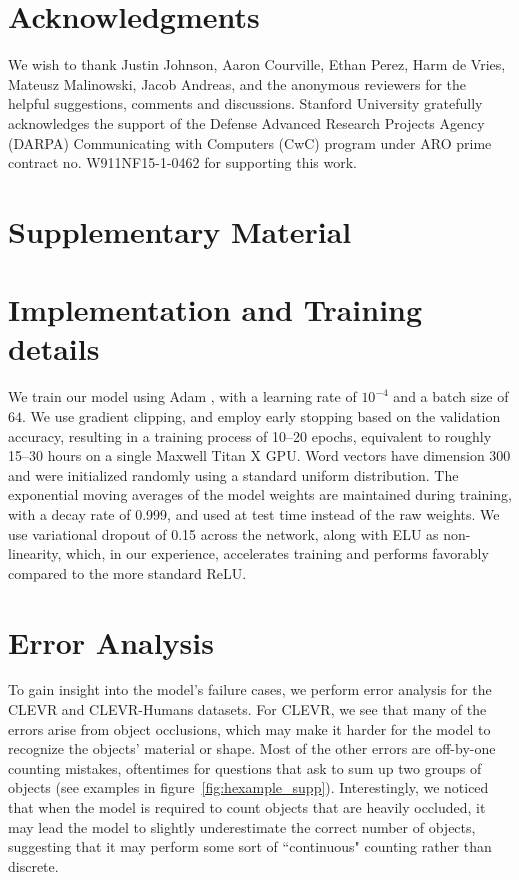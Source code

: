 \documentclass[fleqn]{article}
\newcommand{\figref}[1]{figure~\ref{fig:#1}}
\begin{document}
\section{Acknowledgments}
We wish to thank Justin Johnson, Aaron Courville, Ethan Perez, Harm de Vries, Mateusz Malinowski, Jacob Andreas, and the anonymous reviewers for the helpful suggestions, comments and discussions. Stanford University gratefully acknowledges the support of the Defense Advanced
Research Projects Agency (DARPA) Communicating with Computers (CwC) program under ARO prime contract no. W911NF15-1-0462 for supporting this work.

\newpage



\newpage
\appendix

\section*{Supplementary Material}

\section{Implementation and Training details}
\label{sec:expDetails} 
We train our model using Adam \citep{adam}, with a learning rate of \({10}^{-4}\) and a batch size of \(64\). We use gradient clipping, and employ early stopping based on the validation accuracy, resulting in a training process of 10--20 epochs, equivalent to roughly 15--30 hours on a single Maxwell Titan X GPU. Word vectors have dimension 300 and were initialized randomly using a standard uniform distribution. The exponential moving averages of the model weights are maintained during training, with a decay rate of 0.999, and used at test time instead of the raw weights. We use variational dropout of 0.15 across the network, along with ELU as non-linearity, which, in our experience, accelerates training and performs favorably compared to the more standard ReLU. 

\section{Error Analysis}
\label{sec:erroranalysis} 
To gain insight into the model's failure cases, we perform error analysis for the CLEVR and CLEVR-Humans datasets. For CLEVR, we see that many of the errors arise from object occlusions, which may make it harder for the model to recognize the objects' material or shape. Most of the other errors are off-by-one counting mistakes, oftentimes for questions that ask to sum up two groups of objects (see examples in \figref{hexample_supp}). Interestingly, we noticed that when the model is required to count objects that are heavily occluded, it may lead the model to slightly underestimate the correct number of objects, suggesting that it may perform some sort of ``continuous" counting rather than discrete. 
\end{document}
